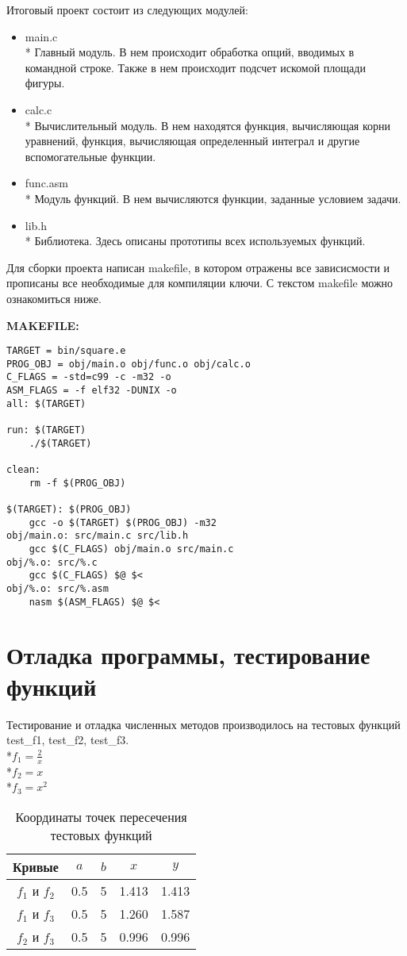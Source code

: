\documentclass[a4paper,12pt,titlepage,finall]{article}
\begin{document}
Итоговый проект состоит из следующих модулей:
\begin{itemize}
    \item main.c
    \\* Главный модуль. В нем происходит обработка опций, вводимых в командной строке. Также в нем происходит подсчет искомой площади фигуры.
    \item calc.c
    \\* Вычислительный модуль. В нем находятся функция, вычисляющая корни уравнений, функция, вычисляющая определенный интеграл и другие вспомогательные функции.
    \item func.asm
    \\* Модуль функций. В нем вычисляются функции, заданные условием задачи.
    \item lib.h
    \\* Библиотека. Здесь описаны прототипы всех используемых функций.
\end{itemize}

Для сборки проекта написан makefile, в котором отражены все зависисмости и прописаны все необходимые для компиляции ключи. С текстом makefile можно ознакомиться ниже.

\textbf{MAKEFILE:}
\begin{verbatim}
TARGET = bin/square.e
PROG_OBJ = obj/main.o obj/func.o obj/calc.o
C_FLAGS = -std=c99 -c -m32 -o
ASM_FLAGS = -f elf32 -DUNIX -o
all: $(TARGET)

run: $(TARGET)
	./$(TARGET)

clean:
	rm -f $(PROG_OBJ)

$(TARGET): $(PROG_OBJ)
	gcc -o $(TARGET) $(PROG_OBJ) -m32
obj/main.o: src/main.c src/lib.h
	gcc $(C_FLAGS) obj/main.o src/main.c
obj/%.o: src/%.c
	gcc $(C_FLAGS) $@ $<
obj/%.o: src/%.asm
	nasm $(ASM_FLAGS) $@ $<
\end{verbatim}

\newpage

\section{Отладка программы, тестирование функций}

Тестирование и отладка численных методов производилось на тестовых функций test\_f1, test\_f2, test\_f3.
\\*$f_1 = \frac{2}{x}$
\\*$f_2 = x$
\\*$f_3 = x^2$

\begin{table}[h]
\centering
\begin{tabular}{|c|c|c|c|c|}
\hline
Кривые & $a$ & $b$ & $x$ & $y$ \\
\hline
$f_1$ и $f_2$ & 0.5 & 5 & 1.413 & 1.413 \\
$f_1$ и $f_3$ & 0.5 & 5 & 1.260 & 1.587 \\
$f_2$ и $f_3$ & 0.5 & 5 & 0.996 & 0.996 \\
\hline
\end{tabular}
\caption{Координаты точек пересечения тестовых функций}
\label{table2}
\end{table}
\end{document}
